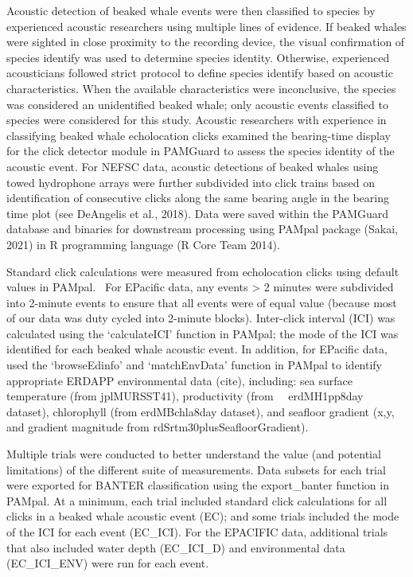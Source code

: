 \documentclass[
  letterpaper,
  DIV=11,
  numbers=noendperiod]{scrartcl}
\begin{document}
Acoustic detection of beaked whale events were then classified to
species by experienced acoustic researchers using multiple lines of
evidence. If beaked whales were sighted in close proximity to the
recording device, the visual confirmation of species identify was used
to determine species identity. Otherwise, experienced acousticians
followed strict protocol to define species identify based on acoustic
characteristics. When the available characteristics were inconclusive,
the species was considered an unidentified beaked whale; only acoustic
events classified to species were considered for this study. Acoustic
researchers with experience in classifying beaked whale echolocation
clicks examined the bearing-time display for the click detector module
in PAMGuard to assess the species identity of the acoustic event. For
NEFSC data, acoustic detections of beaked whales using towed hydrophone
arrays were further subdivided into click trains based on identification
of consecutive clicks along the same bearing angle in the bearing time
plot (see DeAngelis et al., 2018). Data were saved within the PAMGuard
database and binaries for downstream processing using PAMpal package
(Sakai, 2021) in R programming language (R Core Team 2014).

Standard click calculations were measured from echolocation clicks using
default values in PAMpal. ~For EPacific data, any events \textgreater{}
2 minutes were subdivided into 2-minute events to ensure that all events
were of equal value (because most of our data was duty cycled into
2-minute blocks). Inter-click interval (ICI) was calculated using the
`calculateICI' function in PAMpal; the mode of the ICI was identified
for each beaked whale acoustic event. In addition, for EPacific data,
used the `browseEdinfo' and `matchEnvData' function in PAMpal to
identify appropriate ERDAPP environmental data (cite), including: sea
surface temperature (from jplMURSST41), productivity (from~
~erdMH1pp8day dataset), chlorophyll (from erdMBchla8day dataset), and
seafloor gradient (x,y, and gradient magnitude from
rdSrtm30plusSeafloorGradient).

Multiple trials were conducted to better understand the value (and
potential limitations) of the different suite of measurements. Data
subsets for each trial were exported for BANTER classification using the
export\_banter function in PAMpal. At a minimum, each trial included
standard click calculations for all clicks in a beaked whale acoustic
event (EC); and some trials included the mode of the ICI for each event
(EC\_ICI). For the EPACIFIC data, additional trials that also included
water depth (EC\_ICI\_D) and environmental data (EC\_ICI\_ENV) were run
for each event.
\end{document}
